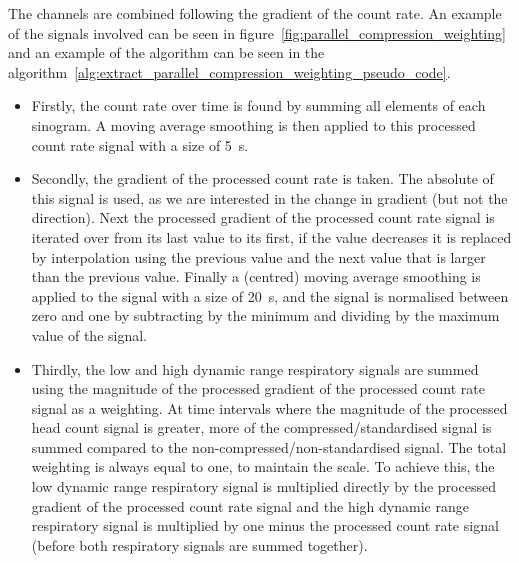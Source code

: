         The channels are combined following the gradient of the count rate. An example of the signals involved can be seen in figure~\ref{fig:parallel_compression_weighting} and an example of the algorithm can be seen in the algorithm~\ref{alg:extract_parallel_compression_weighting_pseudo_code}.

        \begin{itemize}
            \item Firstly, the count rate over time is found by summing all elements of each sinogram. A moving average smoothing is then applied to this processed count rate signal with a size of \SI{5}{\second}.
            
            \item Secondly, the gradient of the processed count rate is taken. The absolute of this signal is used, as we are interested in the change in gradient (but not the direction). Next the processed gradient of the processed count rate signal is iterated over from its last value to its first, if the value decreases it is replaced by interpolation using the previous value and the next value that is larger than the previous value. Finally a (centred) moving average smoothing is applied to the signal with a size of \SI{20}{\second}, and the signal is normalised between zero and one by subtracting by the minimum and dividing by the maximum value of the signal.
            
            \item Thirdly, the low and high dynamic range respiratory signals are summed using the magnitude of the processed gradient of the processed count rate signal as a weighting. At time intervals where the magnitude of the processed head count signal is greater, more of the compressed/standardised signal is summed compared to the non-compressed/non-standardised signal. The total weighting is always equal to one, to maintain the scale. To achieve this, the low dynamic range respiratory signal is multiplied directly by the processed gradient of the processed count rate signal and the high dynamic range respiratory signal is multiplied by one minus the processed count rate signal (before both respiratory signals are summed together).
        \end{itemize}